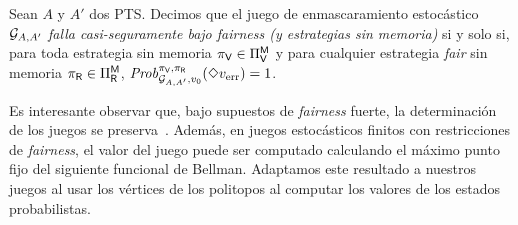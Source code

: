 \begin{definition}
  Sean $A$ y $A'$ dos PTS. Decimos que el juego de enmascaramiento estocástico $\mathcal{G}_{A,A'}$ \emph{falla casi-seguramente bajo fairness
  (y estrategias sin memoria)} si y solo si, para toda estrategia sin memoria
  $\pi_{\mathsf{V}} \in \Pi_{\mathsf{V}}^{\mathsf{M}}$ y para cualquier estrategia \emph{fair} sin memoria
  $\pi_{\mathsf{R}} \in \Pi_{\mathsf{R}}^{\mathsf{M}}$,
  $\mathit{Prob}^{\pi_{\mathsf{V}}, \pi_{\mathsf{R}}}_{\mathcal{G}_{A,A'}, v_0}(\Diamond v_{\text{err}})=1$.
\end{definition}





Es interesante observar que,  bajo supuestos de \emph{fairness} fuerte, la determinación de los juegos se preserva~\cite{CastroDDP22}. Además, en juegos estocásticos finitos con restricciones de \emph{fairness}, el valor del juego puede ser computado calculando el máximo punto fijo del siguiente funcional de Bellman. Adaptamos este resultado a nuestros juegos al usar los vértices de los politopos al computar los valores de los estados probabilistas. %
    
